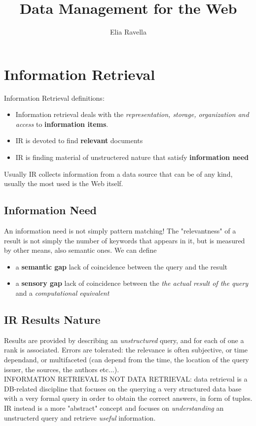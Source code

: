 \documentclass{article}
\title{Data Management for the Web}
\author{Elia Ravella}
\begin{document}
	\begin{titlepage}
		\maketitle
	\end{titlepage}
	
	\tableofcontents
	\clearpage

	\section{Information Retrieval}
		Information Retrieval definitions:
		\begin{itemize}
			\item Information retrieval deals with the \textit{representation, storage, organization and access} to \textbf{information items}.
			\item IR is devoted to find \textbf{relevant} documents
			\item IR is finding material of unstructered nature that satisfy \textbf{information need}
		\end{itemize}
		Usually IR collects information from a data source that can be of any kind, usually the most used is the Web itself.

		\subsection{Information Need}
			An information need is not simply pattern matching! The "relevantness" of a result is not simply the number of keywords that appears in it, but is measured by other means, also semantic ones. We can define 
			\begin{itemize}
				\item a \textbf{semantic gap} lack of coincidence between the query and the result
				\item a \textbf{sensory gap} lack of coincidence between the \textit{the actual result of the query} and a \textit{computational equivalent}
			\end{itemize}

		\subsection{IR Results Nature}
			Results are provided by describing an \textit{unstructured} query, and for each of one a rank is associated. Errors are tolerated: the relevance is often subjective, or time dependand, or multifaceted (can depend from the time, the location of the query issuer, the sources, the authors etc...).\\
			INFORMATION RETRIEVAL IS NOT DATA RETRIEVAL: data retrieval is a DB-related discipline that focuses on the querying a very structured data base with a very formal query in order to obtain the correct answers, in form of tuples. IR instead is a more "abstract" concept and focuses on \textit{understanding} an unstructerd query and retrieve \textit{useful} information.
\end{document}
